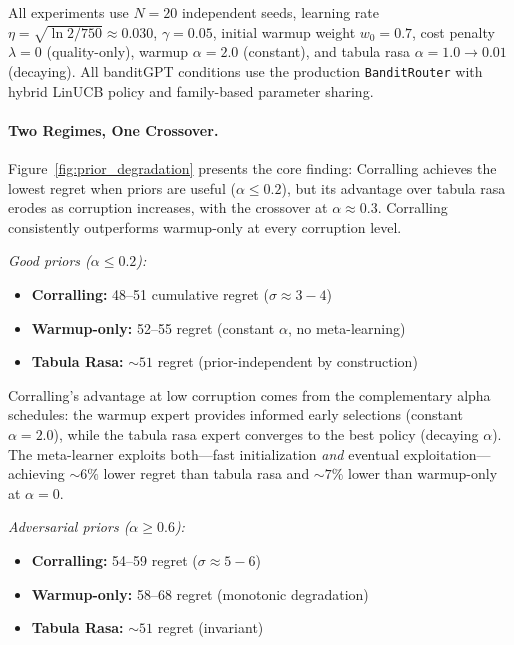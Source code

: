 All experiments use $N{=}20$ independent seeds, learning rate
$\eta{=}\sqrt{\ln 2/750}{\approx}0.030$, $\gamma{=}0.05$, initial
warmup weight $w_0{=}0.7$, cost penalty $\lambda{=}0$ (quality-only),
warmup $\alpha{=}2.0$ (constant), and tabula rasa
$\alpha{=}1.0 \to 0.01$ (decaying).  All banditGPT conditions use the
production \texttt{BanditRouter} with hybrid LinUCB policy and
family-based parameter sharing.

\paragraph{Two Regimes, One Crossover.}
Figure~\ref{fig:prior_degradation} presents the core finding:
Corralling achieves the lowest regret when priors are useful
($\alpha \leq 0.2$), but its advantage over tabula rasa erodes
as corruption increases, with the crossover at $\alpha{\approx}0.3$.
Corralling consistently outperforms warmup-only at every corruption
level.

\emph{Good priors ($\alpha \leq 0.2$):}
\begin{itemize}[nosep]
    \item \textbf{Corralling:} 48--51 cumulative regret ($\sigma{\approx}3{-}4$)
    \item \textbf{Warmup-only:} 52--55 regret (constant $\alpha$,
          no meta-learning)
    \item \textbf{Tabula Rasa:} ${\sim}51$ regret (prior-independent
          by construction)
\end{itemize}

Corralling's advantage at low corruption comes from the complementary
alpha schedules: the warmup expert provides informed early selections
(constant $\alpha{=}2.0$), while the tabula rasa expert converges to
the best policy (decaying $\alpha$).  The meta-learner exploits
both---fast initialization \emph{and} eventual exploitation---achieving
${\sim}6\%$ lower regret than tabula rasa and ${\sim}7\%$ lower than
warmup-only at $\alpha{=}0$.

\emph{Adversarial priors ($\alpha \geq 0.6$):}
\begin{itemize}[nosep]
    \item \textbf{Corralling:} 54--59 regret ($\sigma{\approx}5{-}6$)
    \item \textbf{Warmup-only:} 58--68 regret (monotonic degradation)
    \item \textbf{Tabula Rasa:} ${\sim}51$ regret (invariant)
\end{itemize}

